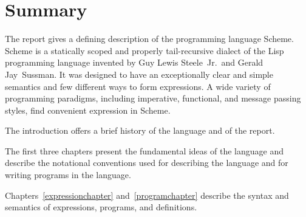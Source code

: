 
\thispagestyle{empty}



\chapter*{Summary}

The report gives a defining description of the programming language
Scheme.  Scheme is a statically scoped and properly tail-recursive
dialect of the Lisp programming language invented by Guy Lewis
Steele~Jr.\ and Gerald Jay~Sussman.  It was designed to have an
exceptionally clear and simple semantics and few different ways to
form expressions.  A wide variety of programming paradigms, including
imperative, functional, and message passing styles, find convenient
expression in Scheme.

\vest The introduction offers a brief history of the language and of
the report.

\vest The first three chapters present the fundamental ideas of the
language and describe the notational conventions used for describing the
language and for writing programs in the language.

\vest Chapters~\ref{expressionchapter} and~\ref{programchapter} describe
the syntax and semantics of expressions, programs, and definitions.

